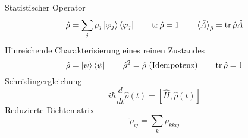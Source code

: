 Statistischer Operator \cite[Glg. 9.5, 9.9, 9.8]{qm}
\begin{equation*}
	\hat{\rho} = \sum_j\rho_j\ket{\varphi_j}\bra{\varphi_j} \qquad \operatorname{tr}\hat{\rho}=1 \qquad \braket{\hat{A}}_{\hat{\rho}}=\operatorname{tr}\hat{\rho}\hat{A}
\end{equation*}
Hinreichende Charakterisierung eines reinen Zustandes \cite[Glg. 9.10, 9.12, 9.13]{qm}
\begin{equation*}
	\hat{\rho}=\ket{\psi}\bra{\psi} \qquad \hat{\rho}^2=\hat{\rho} \ \text{(Idempotenz)} \qquad \operatorname{tr}\hat{\rho}=1
\end{equation*}
Schrödingergleichung \cite[Glg. 9.17]{qm}
\begin{equation*}
	i\hbar\frac{d}{dt}\hat{\rho}(t) = \left[\hat{H},\hat{\rho}(t)\right]
\end{equation*}
Reduzierte Dichtematrix \cite[Glg. 9.23]{qm}
\begin{equation*}
	\tilde{\rho}_{ij} = \sum_k\rho_{kkij}
\end{equation*}
